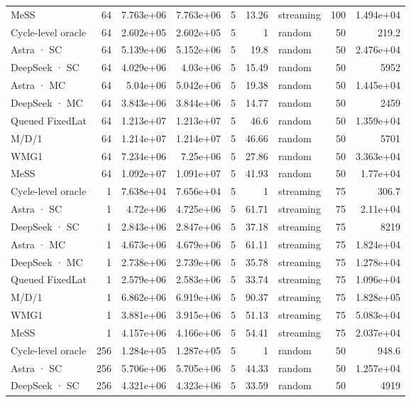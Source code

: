 \begin{tabular}{lrrrrrlrr}
MeSS & 64 & 7.763e+06 & 7.763e+06 & 5 & 13.26 & streaming & 100 & 1.494e+04 \\
Cycle-level oracle & 64 & 2.602e+05 & 2.602e+05 & 5 & 1 & random & 50 & 219.2 \\
Astra · SC & 64 & 5.139e+06 & 5.152e+06 & 5 & 19.8 & random & 50 & 2.476e+04 \\
DeepSeek · SC & 64 & 4.029e+06 & 4.03e+06 & 5 & 15.49 & random & 50 & 5952 \\
Astra · MC & 64 & 5.04e+06 & 5.042e+06 & 5 & 19.38 & random & 50 & 1.445e+04 \\
DeepSeek · MC & 64 & 3.843e+06 & 3.844e+06 & 5 & 14.77 & random & 50 & 2459 \\
Queued FixedLat & 64 & 1.213e+07 & 1.213e+07 & 5 & 46.6 & random & 50 & 1.359e+04 \\
M/D/1 & 64 & 1.214e+07 & 1.214e+07 & 5 & 46.66 & random & 50 & 5701 \\
WMG1 & 64 & 7.234e+06 & 7.25e+06 & 5 & 27.86 & random & 50 & 3.363e+04 \\
MeSS & 64 & 1.092e+07 & 1.091e+07 & 5 & 41.93 & random & 50 & 1.77e+04 \\
Cycle-level oracle & 1 & 7.638e+04 & 7.656e+04 & 5 & 1 & streaming & 75 & 306.7 \\
Astra · SC & 1 & 4.72e+06 & 4.725e+06 & 5 & 61.71 & streaming & 75 & 2.11e+04 \\
DeepSeek · SC & 1 & 2.843e+06 & 2.847e+06 & 5 & 37.18 & streaming & 75 & 8219 \\
Astra · MC & 1 & 4.673e+06 & 4.679e+06 & 5 & 61.11 & streaming & 75 & 1.824e+04 \\
DeepSeek · MC & 1 & 2.738e+06 & 2.739e+06 & 5 & 35.78 & streaming & 75 & 1.278e+04 \\
Queued FixedLat & 1 & 2.579e+06 & 2.583e+06 & 5 & 33.74 & streaming & 75 & 1.096e+04 \\
M/D/1 & 1 & 6.862e+06 & 6.919e+06 & 5 & 90.37 & streaming & 75 & 1.828e+05 \\
WMG1 & 1 & 3.881e+06 & 3.915e+06 & 5 & 51.13 & streaming & 75 & 5.083e+04 \\
MeSS & 1 & 4.157e+06 & 4.166e+06 & 5 & 54.41 & streaming & 75 & 2.037e+04 \\
Cycle-level oracle & 256 & 1.284e+05 & 1.287e+05 & 5 & 1 & random & 50 & 948.6 \\
Astra · SC & 256 & 5.706e+06 & 5.705e+06 & 5 & 44.33 & random & 50 & 1.257e+04 \\
DeepSeek · SC & 256 & 4.321e+06 & 4.323e+06 & 5 & 33.59 & random & 50 & 4919 \\

\end{tabular}
